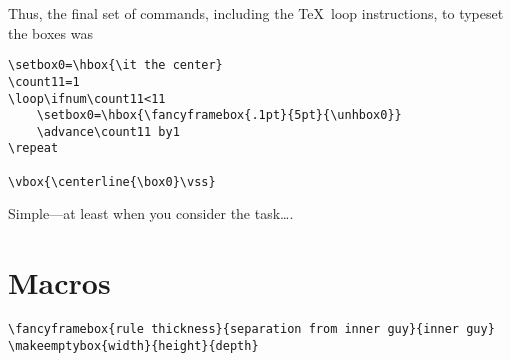 \documentclass[12pt]{article}
\begin{document}
Thus, the final set of commands, including the \TeX\ loop instructions,
to typeset the boxes was
 
\bigskip

\begin{verbatim} 
\setbox0=\hbox{\it the center}
\count11=1
\loop\ifnum\count11<11
    \setbox0=\hbox{\fancyframebox{.1pt}{5pt}{\unhbox0}}
    \advance\count11 by1
\repeat
 
\vbox{\centerline{\box0}\vss}
\end{verbatim}
 
\bigskip
 
Simple---at least when you consider the task\dots.

\section{Macros}


\begin{verbatim}
\fancyframebox{rule thickness}{separation from inner guy}{inner guy}
\makeemptybox{width}{height}{depth}
\end{verbatim}
 
\end{document}
